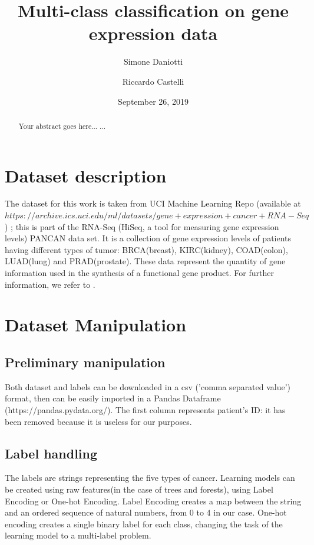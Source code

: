 \documentclass{article}
\title{Multi-class classification on gene expression data}
\author[1]{Simone Daniotti}
\author[2]{Riccardo Castelli}
\affil[1]{Physics Department, University of Milan}
\affil[2]{Informatics Department, University of Milan}
\date{September 26, 2019}                     %
\begin{document}
  \maketitle
  
  
\begin{abstract}
Your abstract goes here...
...
\end{abstract}

\tableofcontents


\section{Dataset description}

The dataset for this work is taken from UCI Machine Learning Repo (available at $https://archive.ics.uci.edu/ml/datasets/gene+expression+cancer+RNA-Seq$) \cite{Dua:2019}; this is part of the RNA-Seq (HiSeq, a tool for measuring gene expression levels) PANCAN data set. It is a collection of gene expression levels of patients having different types of tumor: BRCA(breast), KIRC(kidney), COAD(colon), LUAD(lung) and PRAD(prostate).
These data represent the quantity of gene information used in the synthesis of a functional gene product. For further information, we refer to \cite{weinstein2013cancer}.



\section{Dataset Manipulation}


\subsection{Preliminary manipulation}
Both dataset and labels can be downloaded in a csv ('comma separated value') format, then can be easily imported in a Pandas Dataframe (https://pandas.pydata.org/). The first column represents patient's ID: it has been removed because it is useless for our purposes.



\subsection{Label handling}
The labels are strings representing the five types of cancer. Learning models can be created using raw features(in the case of trees and forests), using Label Encoding or One-hot Encoding.
Label Encoding creates a map between the string and an ordered sequence of natural numbers, from 0 to 4 in our case.
One-hot encoding creates a single binary label for each class, changing the task of the learning model to a multi-label problem.
\end{document}
